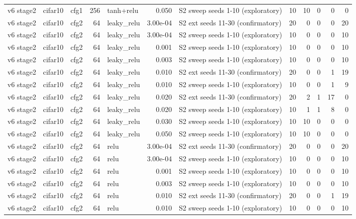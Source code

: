 \begin{table}[htbp]
{\begin{tabular}{@{}lllrlrlrrrrr@{}}
v6 stage2 & cifar10 & cfg1 & 256 & tanh+relu & 0.050 & S2 sweep seeds 1-10 (exploratory) & 10 & 10 & 0 & 0 & 0 \\
v6 stage2 & cifar10 & cfg2 & 64 & leaky\_relu & 3.00e-04 & S2 ext seeds 11-30 (confirmatory) & 20 & 0 & 0 & 0 & 20 \\
v6 stage2 & cifar10 & cfg2 & 64 & leaky\_relu & 3.00e-04 & S2 sweep seeds 1-10 (exploratory) & 10 & 0 & 0 & 0 & 10 \\
v6 stage2 & cifar10 & cfg2 & 64 & leaky\_relu & 0.001 & S2 sweep seeds 1-10 (exploratory) & 10 & 0 & 0 & 0 & 10 \\
v6 stage2 & cifar10 & cfg2 & 64 & leaky\_relu & 0.003 & S2 sweep seeds 1-10 (exploratory) & 10 & 0 & 0 & 0 & 10 \\
v6 stage2 & cifar10 & cfg2 & 64 & leaky\_relu & 0.010 & S2 ext seeds 11-30 (confirmatory) & 20 & 0 & 0 & 1 & 19 \\
v6 stage2 & cifar10 & cfg2 & 64 & leaky\_relu & 0.010 & S2 sweep seeds 1-10 (exploratory) & 10 & 0 & 0 & 1 & 9 \\
v6 stage2 & cifar10 & cfg2 & 64 & leaky\_relu & 0.020 & S2 ext seeds 11-30 (confirmatory) & 20 & 2 & 1 & 17 & 0 \\
v6 stage2 & cifar10 & cfg2 & 64 & leaky\_relu & 0.020 & S2 sweep seeds 1-10 (exploratory) & 10 & 1 & 1 & 8 & 0 \\
v6 stage2 & cifar10 & cfg2 & 64 & leaky\_relu & 0.030 & S2 sweep seeds 1-10 (exploratory) & 10 & 10 & 0 & 0 & 0 \\
v6 stage2 & cifar10 & cfg2 & 64 & leaky\_relu & 0.050 & S2 sweep seeds 1-10 (exploratory) & 10 & 10 & 0 & 0 & 0 \\
v6 stage2 & cifar10 & cfg2 & 64 & relu & 3.00e-04 & S2 ext seeds 11-30 (confirmatory) & 20 & 0 & 0 & 0 & 20 \\
v6 stage2 & cifar10 & cfg2 & 64 & relu & 3.00e-04 & S2 sweep seeds 1-10 (exploratory) & 10 & 0 & 0 & 0 & 10 \\
v6 stage2 & cifar10 & cfg2 & 64 & relu & 0.001 & S2 sweep seeds 1-10 (exploratory) & 10 & 0 & 0 & 0 & 10 \\
v6 stage2 & cifar10 & cfg2 & 64 & relu & 0.003 & S2 sweep seeds 1-10 (exploratory) & 10 & 0 & 0 & 0 & 10 \\
v6 stage2 & cifar10 & cfg2 & 64 & relu & 0.010 & S2 ext seeds 11-30 (confirmatory) & 20 & 0 & 0 & 1 & 19 \\
v6 stage2 & cifar10 & cfg2 & 64 & relu & 0.010 & S2 sweep seeds 1-10 (exploratory) & 10 & 0 & 0 & 0 & 10 \\

\end{tabular}}
\end{table}
